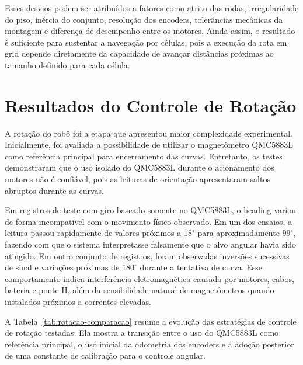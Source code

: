 \documentclass[	12pt, Times, openright, twoside, a4paper, english, brazil]{abntex2}
\begin{document}
Esses desvios podem ser atribuídos a fatores como atrito das rodas, irregularidade do piso, inércia do conjunto, resolução dos encoders, tolerâncias mecânicas da montagem e diferença de desempenho entre os motores. Ainda assim, o resultado é suficiente para sustentar a navegação por células, pois a execução da rota em grid depende diretamente da capacidade de avançar distâncias próximas ao tamanho definido para cada célula.




\section{Resultados do Controle de Rotação}
\label{sec:resultados_controle_rotacao}

A rotação do robô foi a etapa que apresentou maior complexidade experimental. Inicialmente, foi avaliada a possibilidade de utilizar o magnetômetro QMC5883L como referência principal para encerramento das curvas. Entretanto, os testes demonstraram que o uso isolado do QMC5883L durante o acionamento dos motores não é confiável, pois as leituras de orientação apresentaram saltos abruptos durante as curvas.

Em registros de teste com giro baseado somente no QMC5883L, o heading variou de forma incompatível com o movimento físico observado. Em um dos ensaios, a leitura passou rapidamente de valores próximos a \(18^\circ\) para aproximadamente \(99^\circ\), fazendo com que o sistema interpretasse falsamente que o alvo angular havia sido atingido. Em outro conjunto de registros, foram observadas inversões sucessivas de sinal e variações próximas de \(180^\circ\) durante a tentativa de curva. Esse comportamento indica interferência eletromagnética causada por motores, cabos, bateria e ponte H, além da sensibilidade natural de magnetômetros quando instalados próximos a correntes elevadas.

A Tabela~\ref{tab:rotacao-comparacao} resume a evolução das estratégias de controle de rotação testadas. Ela mostra a transição entre o uso do QMC5883L como referência principal, o uso inicial da odometria dos encoders e a adoção posterior de uma constante de calibração para o controle angular.
\end{document}
